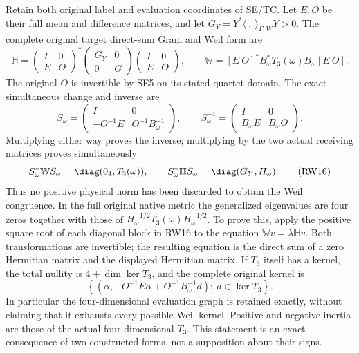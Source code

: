 Retain both original label and evaluation coordinates of SE/TC.
Let $E,O$ be their full mean and difference matrices, and let
$G_Y=Y^*\langle\ ,\ \rangle_{\Gamma,W}Y>0$.
The complete original target direct-sum Gram and Weil form are
\[
 \mathbb H=
 \begin{pmatrix}I&0\\E&O\end{pmatrix}^{\!*}
 \begin{pmatrix}G_Y&0\\0&G\end{pmatrix}
 \begin{pmatrix}I&0\\E&O\end{pmatrix},\qquad
 \mathbb W=[E\ O]^*B_\omega^*T_3(\omega)B_\omega[E\ O].
 \tag{RW14}
\]
The original $O$ is invertible by SE5 on its stated quartet
domain. The exact simultaneous change and inverse are
\[
 S_\omega=\begin{pmatrix}I&0\\-O^{-1}E&O^{-1}B_\omega^{-1}\end{pmatrix},
 \qquad
 S_\omega^{-1}=\begin{pmatrix}I&0\\B_\omega E&B_\omega O\end{pmatrix}.
 \tag{RW15}
\]
Multiplying either way proves the inverse; multiplying by the
two actual receiving matrices proves simultaneously
\[
 S_\omega^*\mathbb W S_\omega=\diag(0_4,T_3(\omega)),\qquad
 S_\omega^*\mathbb H S_\omega=\diag(G_Y,H_\omega).
 \tag{RW16}
\]
Thus no positive physical norm has been discarded to obtain
the Weil congruence. In the full original native metric the
generalized eigenvalues are four zeros together with those
of $H_\omega^{-1/2}T_3(\omega)H_\omega^{-1/2}$.
To prove this, apply the positive square root of each diagonal
block in RW16 to the equation $\mathbb Wv=\lambda\mathbb Hv$.
Both transformations are invertible; the resulting equation is
the direct sum of a zero Hermitian matrix and the displayed
Hermitian matrix. If $T_3$ itself has a kernel, the total
nullity is $4+\dim\ker T_3$, and the complete original kernel is
\[
 \left\{\left(\alpha,-O^{-1}E\alpha+
          O^{-1}B_\omega^{-1}d\right):\ d\in\ker T_3\right\}.
 \tag{RW17}
\]
In particular the four-dimensional evaluation graph is retained
exactly, without claiming that it exhausts every possible Weil
kernel. Positive and negative inertia are those of the actual
four-dimensional $T_3$. This statement is an exact consequence
of two constructed forms, not a supposition about their signs.

